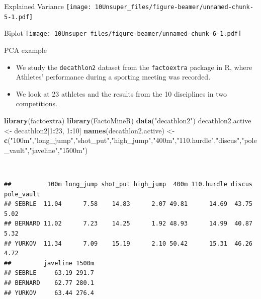 \documentclass[
  10pt,
  ignorenonframetext,
]{beamer}
\newenvironment{Shaded}{\begin{snugshade}}{\end{snugshade}}
\newcommand{\DecValTok}[1]{\textcolor[rgb]{0.00,0.00,0.81}{#1}}
\newcommand{\FunctionTok}[1]{\textcolor[rgb]{0.13,0.29,0.53}{\textbf{#1}}}
\newcommand{\NormalTok}[1]{#1}
\newcommand{\OtherTok}[1]{\textcolor[rgb]{0.56,0.35,0.01}{#1}}
\newcommand{\SpecialCharTok}[1]{\textcolor[rgb]{0.81,0.36,0.00}{\textbf{#1}}}
\newcommand{\StringTok}[1]{\textcolor[rgb]{0.31,0.60,0.02}{#1}}
\begin{document}
\begin{frame}{Explained Variance}
\label{explained-variance}
\texttt{[image: 10Unsuper\_files/figure-beamer/unnamed-chunk-5-1.pdf]}
\end{frame}

\begin{frame}{Biplot}
\label{biplot}
\texttt{[image: 10Unsuper\_files/figure-beamer/unnamed-chunk-6-1.pdf]}
\end{frame}

\begin{frame}[fragile]
\begin{block}{PCA example}
\label{pca-example}
\(~\)

\begin{itemize}
\item
  We study the \texttt{decathlon2} dataset from the \texttt{factoextra}
  package in R, where Athletes' performance during a sporting meeting
  was recorded.
\item
  We look at 23 athletes and the results from the 10 disciplines in two
  competitions.
\end{itemize}

\begin{Shaded}
\begin{Highlighting}[]
\FunctionTok{library}\NormalTok{(factoextra)}
\FunctionTok{library}\NormalTok{(FactoMineR)}
\FunctionTok{data}\NormalTok{(}\StringTok{"decathlon2"}\NormalTok{)}
\NormalTok{decathlon2.active }\OtherTok{\textless{}{-}}\NormalTok{ decathlon2[}\DecValTok{1}\SpecialCharTok{:}\DecValTok{23}\NormalTok{, }\DecValTok{1}\SpecialCharTok{:}\DecValTok{10}\NormalTok{]}
\FunctionTok{names}\NormalTok{(decathlon2.active) }\OtherTok{\textless{}{-}} \FunctionTok{c}\NormalTok{(}\StringTok{"100m"}\NormalTok{,}\StringTok{"long\_jump"}\NormalTok{,}\StringTok{"shot\_put"}\NormalTok{,}\StringTok{"high\_jump"}\NormalTok{,}\StringTok{"400m"}\NormalTok{,}\StringTok{"110.hurdle"}\NormalTok{,}\StringTok{"discus"}\NormalTok{,}\StringTok{"pole\_vault"}\NormalTok{,}\StringTok{"javeline"}\NormalTok{,}\StringTok{"1500m"}\NormalTok{)}
\end{Highlighting}
\end{Shaded}

\(~\)

\scriptsize

\begin{verbatim}
##          100m long_jump shot_put high_jump  400m 110.hurdle discus pole_vault
## SEBRLE  11.04      7.58    14.83      2.07 49.81      14.69  43.75       5.02
## BERNARD 11.02      7.23    14.25      1.92 48.93      14.99  40.87       5.32
## YURKOV  11.34      7.09    15.19      2.10 50.42      15.31  46.26       4.72
##         javeline 1500m
## SEBRLE     63.19 291.7
## BERNARD    62.77 280.1
## YURKOV     63.44 276.4
\end{verbatim}
\end{block}
\end{frame}
\end{document}
